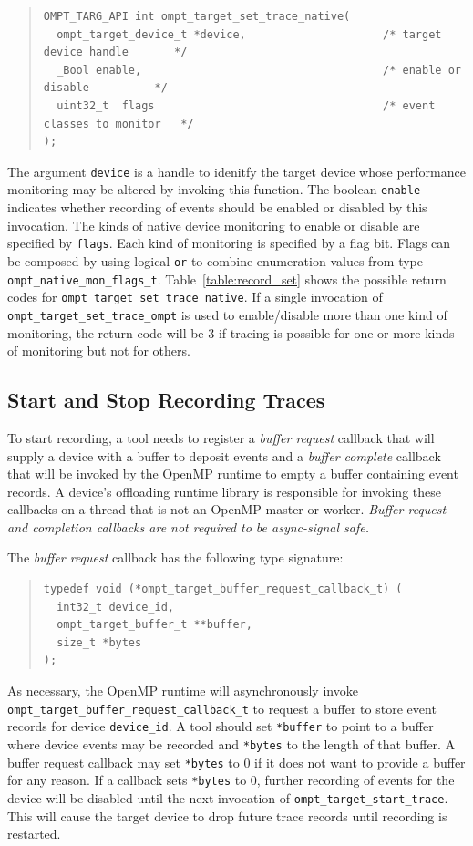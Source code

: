 \documentclass{article}
\begin{document}
\begin{quote}
\begin{verbatim}
OMPT_TARG_API int ompt_target_set_trace_native(
  ompt_target_device_t *device,                     /* target device handle       */
  _Bool enable,                                     /* enable or disable          */
  uint32_t  flags                                   /* event classes to monitor   */
);
\end{verbatim}
\end{quote}
The argument \verb|device| is a handle to idenitfy the target device whose performance monitoring may be altered by invoking this function. 
The boolean \verb|enable| indicates whether recording of events should be enabled or disabled by this invocation.
The kinds of native device monitoring to enable or disable are specified by \verb|flags|. Each kind of monitoring is specified by a flag bit. Flags can be composed by using logical {\tt or}  to combine enumeration values from type \verb|ompt_native_mon_flags_t|.
Table~\ref{table:record_set} shows the possible return codes for \verb|ompt_target_set_trace_native|.
If a single invocation of \verb|ompt_target_set_trace_ompt| is used to enable/disable more than one kind of monitoring, 
the return code will be 3 if tracing is possible for one or more kinds of monitoring but not for others.

\subsection{Start and Stop Recording Traces}
\label{sec:start-stop-recording}

To start recording, a tool needs to register a \emph{buffer request} callback that will supply a device with a buffer to deposit events and a \emph{buffer complete} callback that will be invoked by the OpenMP runtime to empty a buffer containing event records. A device's offloading runtime library is responsible for invoking these callbacks on a thread that is not an OpenMP master or worker. {\em Buffer request and completion callbacks are not required to  be async-signal safe.}

The \emph{buffer request} callback has the following type signature:
\begin{quote}
\begin{verbatim}
typedef void (*ompt_target_buffer_request_callback_t) (
  int32_t device_id,
  ompt_target_buffer_t **buffer,
  size_t *bytes
);
\end{verbatim}
\end{quote}
As necessary, the OpenMP runtime will asynchronously invoke \verb|ompt_target_buffer_request_callback_t| to request a buffer to store event records for device \verb|device_id|.
A tool should set \verb|*buffer| to point to a buffer where device events may be recorded and \verb|*bytes| to the length of that buffer.
A buffer request callback  may set \verb|*bytes| to 0 if it does not want to provide a buffer for any reason. If a callback sets \verb|*bytes| to 0, further recording of events for the device will be disabled until the next invocation of \verb|ompt_target_start_trace|. This will cause the target device to drop future trace records until recording is restarted.
\end{document}
